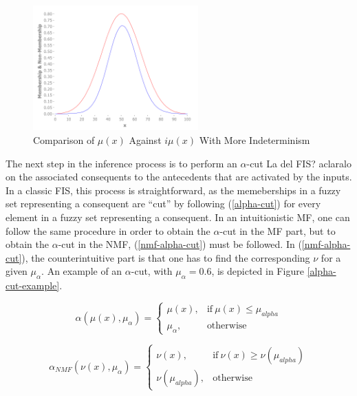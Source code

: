\documentclass[conference]{IEEEtran}
\begin{document}
\begin{figure}[!t]
  \centering
  \includegraphics[width=2.5in]{if-membership-drastic}
  \caption{Comparison of $\mu(x)$ Against $i\mu(x)$ With More Indeterminism}
  \label{if-membership-drastic}
\end{figure}

The next step in the inference process is to perform an $\alpha$-cut %
La del FIS? aclaralo on the associated consequents to the antecedents that are
activated by the inputs. In a classic FIS, this process is straightforward, as
the memeberships in a fuzzy set representing a consequent are ``cut'' by
following (\ref{alpha-cut}) for every element in a fuzzy set representing a
consequent. In an intuitionistic MF, one can follow the same procedure in order
to obtain the $\alpha$-cut in the MF part, but to obtain the $\alpha$-cut in
the NMF, (\ref{nmf-alpha-cut}) must be followed. In (\ref{nmf-alpha-cut}), the
counterintuitive part is that one has to find the corresponding $\nu$ for a
given $\mu_{\alpha}$. An example of an $\alpha$-cut, with $\mu_{\alpha} = 0.6$,
is depicted in Figure \ref{alpha-cut-example}.

\begin{equation}
  \label{alpha-cut}
  \alpha(\mu (x),\mu_{\alpha}) =
  \begin{cases}
    \mu (x), & \text{if}\ \mu (x) \leq \mu_{alpha}  \\
    \mu_{\alpha}, & \text{otherwise}
  \end{cases}
\end{equation}

\begin{equation}
  \label{nmf-alpha-cut}
  \alpha_{NMF}(\nu (x),\mu_{\alpha}) =
  \begin{cases}
    \nu (x), & \text{if}\ \nu (x) \geq \nu (\mu_{alpha})  \\
    \nu (\mu_{alpha}), & \text{otherwise}
  \end{cases}
\end{equation}
\end{document}
